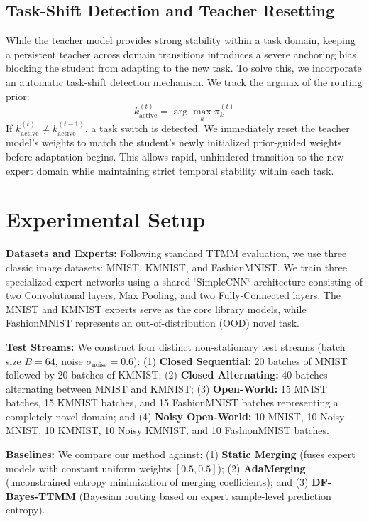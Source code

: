 \documentclass{article}
\theoremstyle{plain}
\theoremstyle{definition}
\theoremstyle{remark}
\begin{document}
\subsection{Task-Shift Detection and Teacher Resetting}
While the teacher model provides strong stability within a task domain, keeping a persistent teacher across domain transitions introduces a severe anchoring bias, blocking the student from adapting to the new task. To solve this, we incorporate an automatic task-shift detection mechanism. We track the argmax of the routing prior:
\begin{equation}
    k_{\text{active}}^{(t)} = \arg\max_k \pi_k^{(t)}
\end{equation}
If $k_{\text{active}}^{(t)} \neq k_{\text{active}}^{(t-1)}$, a task switch is detected. We immediately reset the teacher model's weights to match the student's newly initialized prior-guided weights before adaptation begins. This allows rapid, unhindered transition to the new expert domain while maintaining strict temporal stability within each task.

\section{Experimental Setup}
\label{submission-experiments}

\textbf{Datasets and Experts:} Following standard TTMM evaluation, we use three classic image datasets: MNIST, KMNIST, and FashionMNIST. We train three specialized expert networks using a shared `SimpleCNN` architecture consisting of two Convolutional layers, Max Pooling, and two Fully-Connected layers. The MNIST and KMNIST experts serve as the core library models, while FashionMNIST represents an out-of-distribution (OOD) novel task.

\textbf{Test Streams:} We construct four distinct non-stationary test streams (batch size $B=64$, noise $\sigma_{\text{noise}}=0.6$):
(1) \textbf{Closed Sequential:} 20 batches of MNIST followed by 20 batches of KMNIST;
(2) \textbf{Closed Alternating:} 40 batches alternating between MNIST and KMNIST;
(3) \textbf{Open-World:} 15 MNIST batches, 15 KMNIST batches, and 15 FashionMNIST batches representing a completely novel domain; and
(4) \textbf{Noisy Open-World:} 10 MNIST, 10 Noisy MNIST, 10 KMNIST, 10 Noisy KMNIST, and 10 FashionMNIST batches.

\textbf{Baselines:} We compare our method against:
(1) \textbf{Static Merging} (fuses expert models with constant uniform weights $[0.5, 0.5]$);
(2) \textbf{AdaMerging} \cite{liang2023adamerging} (unconstrained entropy minimization of merging coefficients); and
(3) \textbf{DF-Bayes-TTMM} \cite{anonymous2026dfbayes} (Bayesian routing based on expert sample-level prediction entropy).
\end{document}
